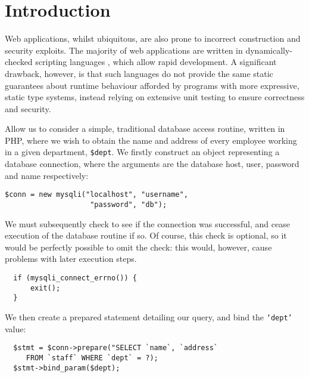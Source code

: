 \documentclass[preprint]{sigplanconf}
\begin{document}



\section{Introduction}
Web applications, whilst ubiquitous, are also prone to incorrect construction and security exploits. The majority of web applications are written in dynamically-checked scripting languages \cite{}, which allow rapid development. A significant drawback, however, is that such languages do not provide  the same static guarantees about runtime behaviour afforded by programs with more expressive, static type systems, instead relying on extensive unit testing to ensure correctness and security. 

Allow us to consider a simple, traditional database access routine, written in PHP, where we wish to obtain the name and address of every employee working in a given department, \texttt{\$dept}. We firstly construct an object representing a database connection, where the arguments are the database host, user, password and name respectively:

{\small
\begin{verbatim}
$conn = new mysqli("localhost", "username", 
                    "password", "db");
\end{verbatim}
}

We must subsequently check to see if the connection was successful, and cease execution of the database routine if so. Of course, this check is optional, so it would be perfectly possible to omit the check: this would, however, cause problems with later execution steps.

{\small
\begin{verbatim}
  if (mysqli_connect_errno()) {
      exit();
  }
\end{verbatim}
}

We then create a prepared statement detailing our query, and bind the \texttt{`dept'} value:

{\small
\begin{verbatim}
  $stmt = $conn->prepare("SELECT `name`, `address` 
     FROM `staff` WHERE `dept` = ?);
  $stmt->bind_param($dept);
\end{verbatim}
}
\end{document}

